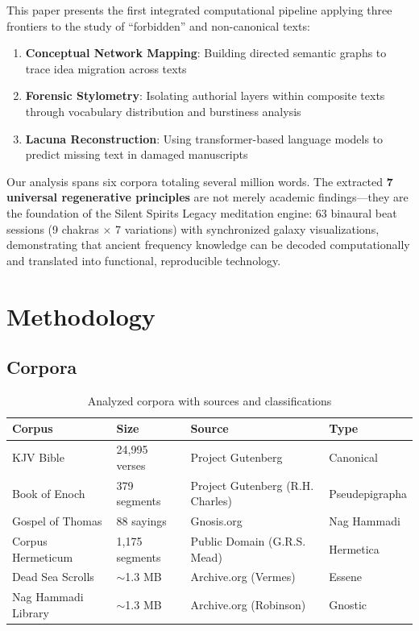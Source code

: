 \documentclass[11pt]{article}
\begin{document}
This paper presents the first integrated computational pipeline applying three frontiers to the study of ``forbidden'' and non-canonical texts:

\begin{enumerate}
    \item \textbf{Conceptual Network Mapping}: Building directed semantic graphs to trace idea migration across texts
    \item \textbf{Forensic Stylometry}: Isolating authorial layers within composite texts through vocabulary distribution and burstiness analysis
    \item \textbf{Lacuna Reconstruction}: Using transformer-based language models to predict missing text in damaged manuscripts
\end{enumerate}

Our analysis spans six corpora totaling several million words. The extracted \textbf{7 universal regenerative principles} are not merely academic findings---they are the foundation of the Silent Spirits Legacy meditation engine: 63 binaural beat sessions (9 chakras $\times$ 7 variations) with synchronized galaxy visualizations, demonstrating that ancient frequency knowledge can be decoded computationally and translated into functional, reproducible technology.

\section{Methodology}

\subsection{Corpora}

\begin{table}[h]
\centering
\begin{tabular}{@{}llll@{}}
\toprule
Corpus & Size & Source & Type \\
\midrule
KJV Bible & 24,995 verses & Project Gutenberg & Canonical \\
Book of Enoch & 379 segments & Project Gutenberg (R.H. Charles) & Pseudepigrapha \\
Gospel of Thomas & 88 sayings & Gnosis.org & Nag Hammadi \\
Corpus Hermeticum & 1,175 segments & Public Domain (G.R.S. Mead) & Hermetica \\
Dead Sea Scrolls & $\sim$1.3 MB & Archive.org (Vermes) & Essene \\
Nag Hammadi Library & $\sim$1.3 MB & Archive.org (Robinson) & Gnostic \\
\bottomrule
\end{tabular}
\caption{Analyzed corpora with sources and classifications}
\end{table}
\end{document}
